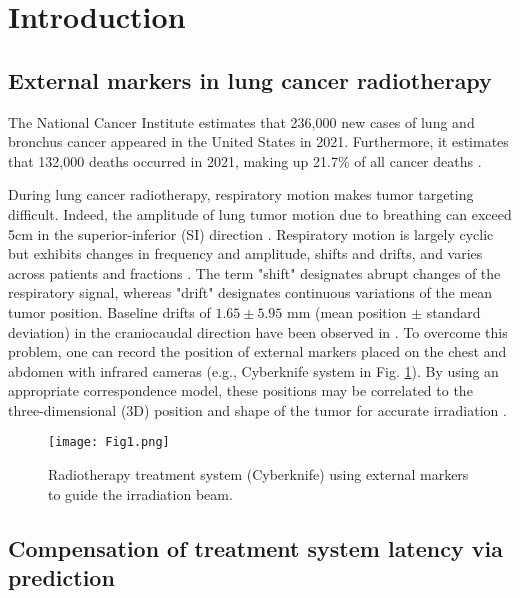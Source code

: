 \documentclass[twocolumn,a4paper]{svjour3} \sloppy          \smartqed
\begin{document}
\section{Introduction}

\subsection{External markers in lung cancer radiotherapy} 
\label{subs:external markers}

The National Cancer Institute estimates that 236,000 new cases of lung and bronchus cancer appeared in the United States in 2021. Furthermore, it estimates that 132,000 deaths occurred in 2021, making up 21.7\% of all cancer deaths \cite{NIC2020LungBronchusCancer}.   

During lung cancer radiotherapy, respiratory motion makes tumor targeting difficult. Indeed, the amplitude of lung tumor motion due to breathing can exceed 5cm in the superior-inferior (SI) direction \cite{sarudis2017systematic}. Respiratory motion is largely cyclic but exhibits changes in frequency and amplitude, shifts and drifts, and varies across patients and fractions \cite{verma2010survey, ehrhardt20134d}. The term "shift" designates abrupt changes of the respiratory signal, whereas "drift" designates continuous variations of the mean tumor position. Baseline drifts of $1.65 \pm 5.95$ mm (mean position $\pm$ standard deviation) in the craniocaudal direction have been observed in \cite{takao2016intrafractional}. To overcome this problem, one can record the position of external markers placed on the chest and abdomen with infrared cameras (e.g., Cyberknife system \cite{khankan2017demystifying} in Fig. \ref{fig:treatment system}). By using an appropriate correspondence model, these positions may be correlated to the three-dimensional (3D) position and shape of the tumor for accurate irradiation \cite{ehrhardt20134d, mcclelland2013respiratory}.

\begin{figure}[thb!]
\centering
\texttt{[image: Fig1.png]}
\caption{Radiotherapy treatment system (Cyberknife) using external markers to guide the irradiation beam\protect\footnotemark.} \label{fig:treatment system}
\end{figure}



\subsection{Compensation of treatment system latency via prediction}
\label{section:intro pred in radiotherapy}
\end{document}
